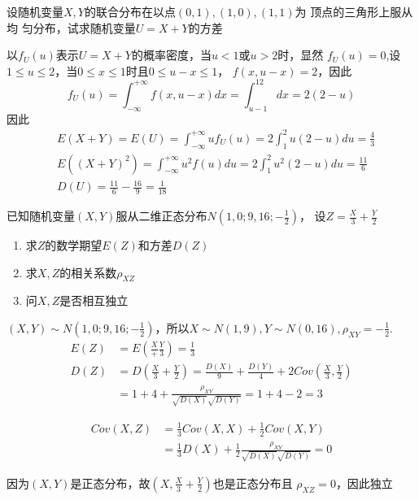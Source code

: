 \documentclass{article}
\begin{document}
\begin{examplle}[]
设随机变量\(X,Y\)的联合分布在以点\((0,1),(1,0),(1,1)\)为 顶点的三角形上服从均
匀分布，试求随机变量\(U=X+Y\)的方差

以\(f_U(u)\)表示\(U=X+Y\)的概率密度，当\(u<1\)或\(u>2\)时，显然
\(f_U(u)=0\),设\(1\le u\le2\)，当\(0\le x\le 1\)时且\(0\le u-x\le1\)，
\(f(x,u-x)=2\)，因此
\begin{equation*}
f_U(u)=\int_{-\infty}^{+\infty}f(x,u-x)dx=\int_{u-1}^12dx=2(2-u)
\end{equation*}
因此
\begin{align*}
&E(X+Y)=E(U)=\int_{-\infty}^{+\infty}uf_U(u)=2\int_1^2u(2-u)du=\frac{4}{3}\\
&E((X+Y)^2)=\int_{-\infty}^{+\infty}u^2f(u)du=2\int_1^2u^2(2-u)du=\frac{11}{6}\\
&D(U)=\frac{11}{6}-\frac{16}{9}=\frac{1}{18}
\end{align*}
\end{examplle}

\begin{examplle}[]
已知随机变量\((X,Y)\)服从二维正态分布\(N\left(1,0;9,16;-\frac{1}{2}\right)\)，
设\(Z=\frac{X}{3}+\frac{Y}{2}\)
\begin{enumerate}
\item 求\(Z\)的数学期望\(E(Z)\)和方差\(D(Z)\)
\item 求\(X,Z\)的相关系数\(\rho_{XZ}\)
\item 问\(X,Z\)是否相互独立
\end{enumerate}


\((X,Y)\sim N\left(1,0;9,16;-\frac{1}{2}\right)\)，所以\(X\sim N(1,9),Y\sim
   N(0,16),\rho_{XY}=-\frac{1}{2}\).
\begin{align*}
E(Z)&=E(\frac{X}+\frac{Y}{3})=\frac{1}{3}\\
D(Z)&=D(\frac{X}{3}+\frac{Y}{2})=\frac{D(X)}{9}+\frac{D(Y)}{4}+2Cov(\frac{X}{3},\frac{Y}{2})\\
&=1+4+\frac{\rho_{XY}}{\sqrt{D(X)}\sqrt{D(Y)}}=1+4-2=3
\end{align*}

\begin{align*}
Cov(X,Z)&=\frac{1}{3}Cov(X,X)+\frac{1}{2}Cov(X,Y)\\
&=\frac{1}{3}D(X)+\frac{1}{2}\frac{\rho_{XY}}{\sqrt{D(X)}\sqrt{D(Y)}}=0
\end{align*}

因为\((X,Y)\)是正态分布，故\((X,\frac{X}{3}+\frac{Y}{2})\)也是正态分布且
\(\rho_{XZ}=0\)，因此独立
\end{examplle}
\end{document}
